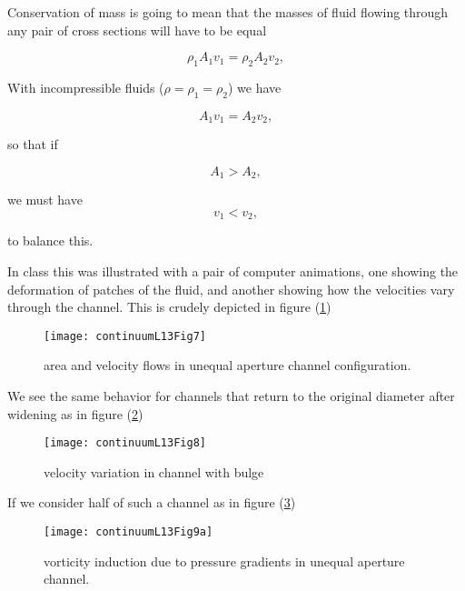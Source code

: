 Conservation of mass is going to mean that the masses of fluid flowing through any pair of cross sections will have to be equal

\begin{equation}\label{eqn:continuumL13:80}
\rho_1 A_1 v_1 = \rho_2 A_2 v_2,
\end{equation}

With incompressible fluids ($\rho = \rho_1 = \rho_2$) we have

\begin{equation}\label{eqn:continuumL13:100}
A_1 v_1 = A_2 v_2,
\end{equation}

so that if 

\begin{equation}\label{eqn:continuumL13:120}
A_1 > A_2,
\end{equation}

we must have
\begin{equation}\label{eqn:continuumL13:140}
v_1 < v_2,
\end{equation}

to balance this.

In class this was illustrated with a pair of computer animations, one showing the deformation of patches of the fluid, and another showing how the velocities vary through the channel.  This is crudely depicted in figure (\ref{fig:continuumL13:continuumL13Fig7})

\begin{figure}[htp]
   \centering
   \texttt{[image: continuumL13Fig7]}
   \caption{area and velocity flows in unequal aperture channel configuration.}\label{fig:continuumL13:continuumL13Fig7}
\end{figure}

We see the same behavior for channels that return to the original diameter after widening as in figure (\ref{fig:continuumL13:continuumL13Fig8})

\begin{figure}[htp]
   \centering
   \texttt{[image: continuumL13Fig8]}
   \caption{velocity variation in channel with bulge}\label{fig:continuumL13:continuumL13Fig8}
\end{figure}

If we consider half of such a channel as in figure (\ref{fig:continuumL13:continuumL13Fig9a})
\begin{figure}[htp]
   \centering
   \texttt{[image: continuumL13Fig9a]}
   \caption{vorticity induction due to pressure gradients in unequal aperture channel.}\label{fig:continuumL13:continuumL13Fig9a}
\end{figure}

